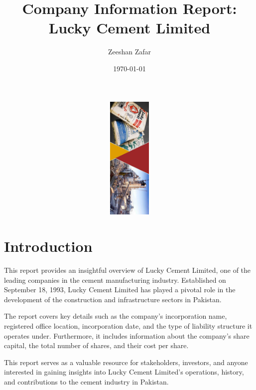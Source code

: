 \documentclass{article}
\title{Company Information Report: Lucky Cement Limited}
\author{Zeeshan Zafar}
\date{\today}
\begin{document}
\maketitle


\begin{minipage}[b]{0.5\textwidth}
  \includegraphics[width=1.5\textwidth, height=6cm, angle=90]{pictures/first.jpg}
\end{minipage}%
\begin{minipage}[b]{0.3\textwidth}
\vspace{40pt}

\section{Introduction}

  This report provides an insightful overview of Lucky Cement Limited, one of the leading companies in the cement manufacturing industry. Established on September 18, 1993, Lucky Cement Limited has played a pivotal role in the development of the construction and infrastructure sectors in Pakistan.

\vspace{12pt}
  The report covers key details such as the company's incorporation name, registered office location, incorporation date, and the type of liability structure it operates under. Furthermore, it includes information about the company's share capital, the total number of shares, and their cost per share.

\vspace{12pt}
  This report serves as a valuable resource for stakeholders, investors, and anyone interested in gaining insights into Lucky Cement Limited's operations, history, and contributions to the cement industry in Pakistan.
\end{minipage}
\end{document}
